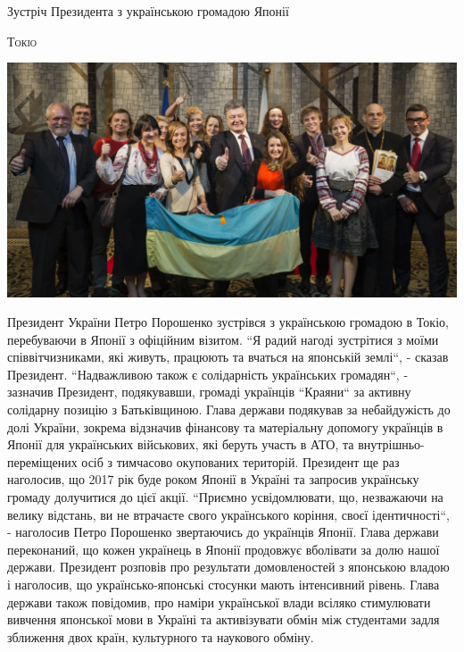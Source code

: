 \documentclass[10pt,a4paper]{article}
\newcommand{\NewsItem}[1]{%
		\usefont{T2A}{iwona}{m}{n} 
		\large #1 \vspace{4pt}
		\par \normalsize \normalfont}
\newcommand{\NewsAuthor}[1]{%
			\hfill \textsc{#1} \vspace{4pt}
			\par \normalfont}
\begin{document}
\begin{multicols}{2}
\NewsItem{Зустріч Президента з українською громадою Японії}
\NewsAuthor{Токіо}
\begin{center}
\includegraphics[width=0.8\linewidth]{images/13}
\end{center}
Президент України Петро Порошенко зустрівся з українською громадою в Токіо, перебуваючи в Японії з офіційним візитом. ``Я радий нагоді зустрітися з моїми співвітчизниками, які живуть, працюють та вчаться на японській землі``, - сказав Президент. ``Надважливою також є солідарність українських громадян``, - зазначив Президент, подякувавши, громаді українців ``Краяни`` за активну солідарну позицію з Батьківщиною. Глава держави подякував за небайдужість до долі України, зокрема відзначив фінансову та матеріальну допомогу українців в Японії для українських військових, які беруть участь в АТО, та внутрішньо-переміщених осіб з тимчасово окупованих територій. Президент ще раз наголосив, що 2017 рік буде роком Японії в Україні та запросив українську громаду долучитися до цієї акції. ``Приємно усвідомлювати, що, незважаючи на велику відстань, ви не втрачаєте свого українського коріння, своєї ідентичності``, - наголосив Петро Порошенко звертаючись до українців Японії. Глава держави переконаний, що кожен українець в Японії продовжує вболівати за долю нашої держави. Президент розповів про результати домовленостей з японською владою і наголосив, що українсько-японські стосунки мають інтенсивний рівень. Глава держави також повідомив, про наміри української влади всіляко стимулювати вивчення японської мови в Україні та активізувати обмін між студентами задля зближення двох країн, культурного та наукового обміну.

\vspace{1cm}


\end{multicols}
\end{document}
